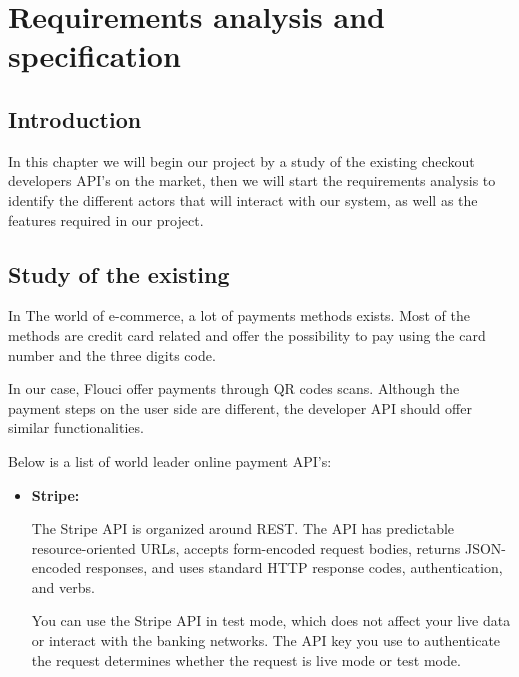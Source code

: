 
\setcounter{chapter}{1}
\chapter{Requirements analysis and specification}
\minitoc %
\graphicspath{{Chapter2/figures/}}


\pagestyle{fancy}
\fancyhf{}
\fancyhead[R]{\bfseries\rightmark}
\fancyfoot[R]{\thepage}
\renewcommand{\headrulewidth}{0.5pt}
\renewcommand{\footrulewidth}{0pt}
\renewcommand{\chaptermark}[1]{\markboth{\MakeUppercase{\chaptername~\thechapter. #1 }}{}}
\renewcommand{\sectionmark}[1]{\markright{\thechapter.\thesection~ #1}}

\begin{spacing}{1.2}
\section*{Introduction}
In this chapter we will begin our project by a study of the existing checkout developers API's on the market, then we will start the requirements analysis to identify the different actors that will interact with our system, as well as the features required in our project.
\section{Study of the existing}
In The world of e-commerce, a lot of payments methods exists.  Most of the methods are credit card related and offer the possibility to pay using the card number and the three digits code.

In our case, Flouci offer payments through QR codes scans. Although the payment steps on the user side are different, the developer API should offer similar functionalities.


Below is a list of world leader online payment API's:
\begin{itemize}
  \item \textbf{Stripe:}

 The Stripe API is organized around REST. The API has predictable resource-oriented URLs, accepts form-encoded request bodies, returns JSON-encoded responses, and uses standard HTTP response codes, authentication, and verbs.

You can use the Stripe API in test mode, which does not affect your live data or interact with the banking networks. The API key you use to authenticate the request determines whether the request is live mode or test mode.


\end{itemize}
\end{spacing}

